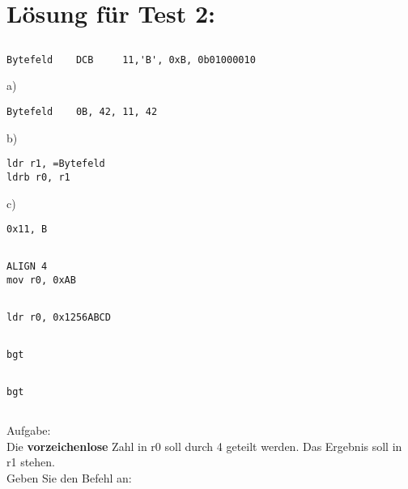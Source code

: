 
\section{Lösung für Test 2:}
\subsection{}
\begin{lstlisting}
Bytefeld 	DCB 	11,'B', 0xB, 0b01000010
\end{lstlisting}

a)
\begin{lstlisting}
Bytefeld 	0B, 42, 11, 42
\end{lstlisting}
 
b)
\begin{lstlisting}
ldr r1, =Bytefeld
ldrb r0, r1 
\end{lstlisting} 
 
c)
\begin{lstlisting}
0x11, B
\end{lstlisting} 

\subsection{}
\begin{lstlisting}
ALIGN 4
mov r0, 0xAB
\end{lstlisting} 

\subsection{}
\begin{lstlisting}
ldr r0, 0x1256ABCD
\end{lstlisting} 

\subsection{}
\begin{lstlisting}
bgt
\end{lstlisting} 

\subsection{}
\begin{lstlisting}
bgt
\end{lstlisting} 
 
\subsection{}
Aufgabe:\\
Die \textbf{vorzeichenlose} Zahl in r0 soll durch 4 geteilt werden. Das Ergebnis soll in r1 stehen.\\
Geben Sie den Befehl an:\\


